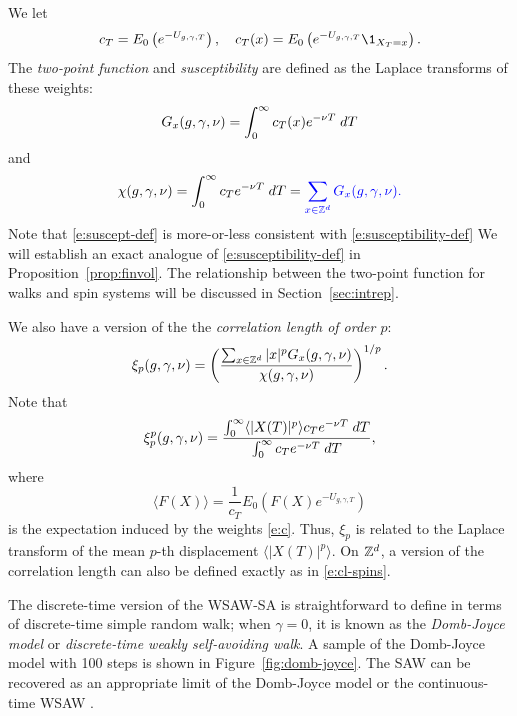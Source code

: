 We let
\begin{equation}
\label{e:c}
c_T = E_0\left(e^{-U_{\gcc,\gamma,T}}\right),
	\quad
c_T(x) = E_0\left(e^{-U_{\gcc,\gamma,T}}\1_{X_T = x}\right).
\end{equation}
The \emph{two-point function} and \emph{susceptibility} are defined
as the Laplace transforms of these weights:
\begin{equation}
\lbeq{Gsa}
G_x(\gcc,\gamma,\nu)
    =
\int_0^\infty c_T(x) e^{-\nu T} \; dT
\end{equation}
and
\begin{equation}
\label{e:suscept-def}
\chi(g, \gamma, \nu)
	=
\int_0^\infty c_T e^{-\nu T} \; dT
	=
{\color{blue} \sum_{x\in{ {{\mathbb Z}}^d }} G_x(g,\gamma,\nu).}
\end{equation}
Note that \eqref{e:suscept-def} is more-or-less consistent with \eqref{e:susceptibility-def}
We will establish an exact analogue of \eqref{e:susceptibility-def} in Proposition~\ref{prop:finvol}.
The relationship between the two-point function for walks and spin systems will be
discussed in Section~\ref{sec:intrep}.

We also have a version of the the \emph{correlation length of order $p$}:
\begin{equation}
\label{e:clp-wsawsa}
\xi_p(g, \gamma, \nu)
	=
\left(\frac{\sum_{x\in{ {{\mathbb Z}}^d }} |x|^p G_x(g, \gamma, \nu)}{\chi(g, \gamma, \nu)}\right)^{1/p}.
\end{equation}
Note that
\begin{equation}
\xi_p^p(g,\gamma,\nu)
	=
\frac
{\int_0^\infty \langle |X(T)|^p \rangle c_T e^{-\nu T} \; dT}
{\int_0^\infty c_T e^{-\nu T} \; dT},
\end{equation}
where
\begin{equation}
\langle F(X) \rangle
	=
\frac{1}{c_T} E_0 (F(X) e^{-U_{g,\gamma,T}})
\end{equation}
is the expectation induced by the weights \eqref{e:c}.
Thus, $\xi_p$ is related to the Laplace transform of the mean $p$-th displacement
$\langle |X(T)|^p \rangle$.
On ${ {{\mathbb Z}}^d }$, a version of the correlation length can also be defined exactly as in \eqref{e:cl-spins}.

\begin{rk}
The discrete-time version of the WSAW-SA is straightforward to define in terms of
discrete-time simple random walk; when
$\gamma = 0$, it is known as the \emph{Domb-Joyce model} or \emph{discrete-time
weakly self-avoiding walk}. A sample of the Domb-Joyce model with 100 steps is shown
in Figure~\ref{fig:domb-joyce}. The SAW can be recovered as an
appropriate limit of the Domb-Joyce model or the continuous-time WSAW \cite{BDS12}.
\end{rk}

